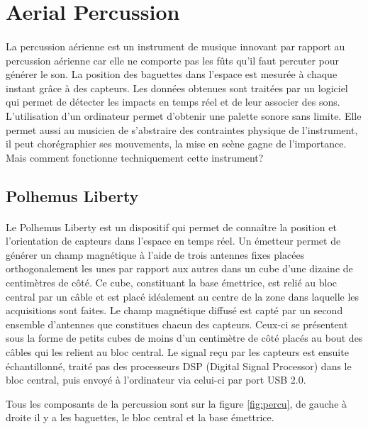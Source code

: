 \section{Aerial Percussion}

\paragraph{}
La percussion aérienne est un instrument de musique innovant par rapport au percussion aérienne car elle ne comporte pas les fûts qu'il faut percuter pour générer le son. La position des baguettes dans l'espace est mesurée à chaque instant grâce à des capteurs. Les données obtenues sont traitées par un logiciel qui permet de détecter les impacts en temps réel et de leur associer des sons. L'utilisation d'un ordinateur permet d'obtenir une palette sonore sans limite. Elle permet aussi au musicien de s'abstraire des contraintes physique de l'instrument, il peut chorégraphier ses mouvements, la mise en scène gagne de l'importance.
Mais comment fonctionne techniquement cette instrument?

\subsection{Polhemus Liberty}

\paragraph{}
Le Polhemus Liberty est un dispositif qui permet de connaître la position et l'orientation de capteurs dans l'espace en temps réel. Un émetteur permet de générer un champ magnétique à l'aide de trois antennes fixes placées orthogonalement les unes par rapport aux autres dans un cube d'une dizaine de centimètres de côté. Ce cube, constituant la base émettrice, est relié au bloc central par un câble et est placé idéalement au centre de la zone dans laquelle les acquisitions sont faites. Le champ magnétique diffusé est capté par un second ensemble d'antennes que constitues chacun des capteurs. Ceux-ci se présentent sous la forme de petits cubes de moins d'un centimètre de côté placés au bout des câbles qui les relient au bloc central. Le signal reçu par les capteurs est ensuite échantillonné, traité pas des processeurs DSP (Digital Signal Processor) dans le bloc central, puis envoyé à l'ordinateur via celui-ci par port USB 2.0.

Tous les composants de la percussion sont sur la figure \ref{fig:percu}, de gauche à droite il y a les baguettes, le bloc central et la base émettrice.

